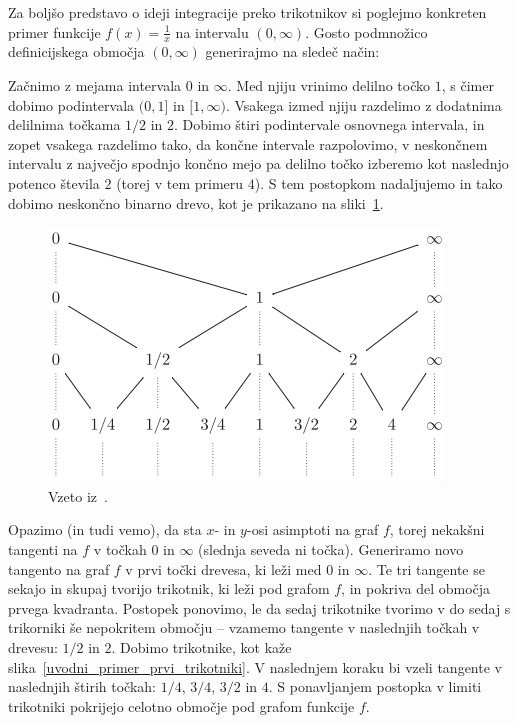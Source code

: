 \documentclass[a4paper, 12pt, titlepage]{article}
\begin{document}
Za boljšo predstavo o ideji integracije preko trikotnikov si poglejmo konkreten primer funkcije $ f(x) = \frac{1}{x} $ na intervalu $ (0, \infty) $. Gosto podmnožico definicijskega območja $ (0, \infty) $ generirajmo na sledeč način:

Začnimo z mejama intervala $ 0 $ in $ \infty $. Med njiju vrinimo delilno točko $ 1 $, s čimer dobimo podintervala $ (0, 1] $ in $ [1, \infty) $. Vsakega izmed njiju razdelimo z dodatnima delilnima točkama $ 1/2 $ in $ 2 $. Dobimo štiri podintervale osnovnega intervala, in zopet vsakega razdelimo tako, da končne intervale razpolovimo, v neskončnem intervalu z največjo spodnjo končno mejo pa delilno točko izberemo kot naslednjo potenco števila $ 2 $ (torej v tem primeru $ 4 $). S tem postopkom nadaljujemo in tako dobimo neskončno binarno drevo, kot je prikazano na sliki~\ref{uvodni_primer_drevo}.

\begin{figure}[h]
    \centering
    \includegraphics{slike/uvodni_primer_drevo.png}
    \caption{Vzeto iz~\cite{osnovni_clanek}.}
    \label{uvodni_primer_drevo}
\end{figure}

Opazimo (in tudi vemo), da sta $ x $- in $ y $-osi asimptoti na graf $ f $, torej nekakšni tangenti na $ f $ v točkah $ 0 $ in $ \infty $ (slednja seveda ni točka). Generiramo novo tangento na graf $ f $ v prvi točki drevesa, ki leži med $ 0 $ in $ \infty $. Te tri tangente se sekajo in skupaj tvorijo trikotnik, ki leži pod grafom $ f $, in pokriva del območja prvega kvadranta. Postopek ponovimo, le da sedaj trikotnike tvorimo v do sedaj s trikorniki še nepokritem območju -- vzamemo tangente v naslednjih točkah v drevesu: $ 1/2 $ in $ 2 $. Dobimo trikotnike, kot kaže slika~\ref{uvodni_primer_prvi_trikotniki}. V naslednjem koraku bi vzeli tangente v naslednjih štirih točkah: $ 1/4 $, $ 3/4 $, $ 3/2 $ in $ 4 $. S ponavljanjem postopka v limiti trikotniki pokrijejo celotno območje pod grafom funkcije $ f $.
\end{document}
